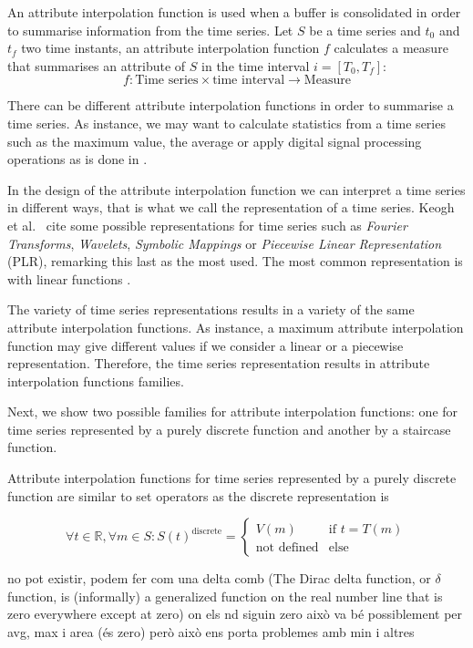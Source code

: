 {\color{red}

  An attribute interpolation function is used when a buffer is
  consolidated in order to summarise information from the time series.
  Let $S$ be a time series and $t_0$ and $t_f$ two time instants, an
  attribute interpolation function $f$ calculates a measure that
  summarises an attribute of $S$ in the time interval $i=[T_0,T_f]$:
\[
f: \text{Time series} \times \text{time interval} \longrightarrow
\text{Measure}
\]


There can be different attribute interpolation functions in order to summarise a
time series. As instance, we may want to calculate statistics from a time series such as the maximum value, the average or apply digital signal processing operations as is done in \cite{zhang11}. 

In the design of the attribute interpolation function we can interpret
a time series in different ways, that is what we call the
representation of a time series. Keogh et al.\ \cite{last:keogh} cite some
possible representations for time series such as \emph{Fourier
  Transforms}, \emph{Wavelets}, \emph{Symbolic Mappings} or
\emph{Piecewise Linear Representation} (PLR), remarking this last as
the most used. The most common representation is with linear functions
\cite{keogh01}.  

The variety of time series representations results in a variety of the
same attribute interpolation functions. As instance, a maximum
attribute interpolation function may give different values if we
consider a linear or a piecewise representation. Therefore, the time
series representation results in attribute interpolation
functions families.  


Next, we show two possible families for attribute interpolation
functions: one for time series represented by a purely discrete
function and another by a staircase function.


Attribute interpolation functions for time series represented by a
purely discrete function are similar to set operators as the discrete representation is  

$$
\forall t \in \mathbb{R}  ,\forall m \in S:
S(t)^{\text{discrete}} =  
\begin{cases}
  V(m) & \text{if }  t=T(m) \\
  \text{not defined} & \text{else} 
\end{cases}
$$


no pot existir, podem fer com una delta comb (The Dirac delta function, or $\delta$ function, is (informally) a generalized function on the real number line that is zero everywhere except at zero) on els nd siguin zero això va bé possiblement per avg, max i area (és zero) però això ens porta problemes amb min i altres

}
